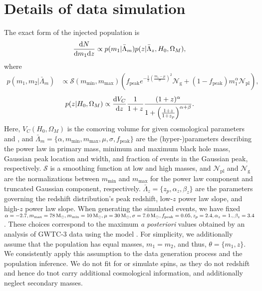 \documentclass[preprint2,linenumbers]{aastex631}
\begin{document}
\section{Details of data simulation}
\label{ap:data generation}
The exact form of the injected population is
\begin{equation}
\label{eq:underlying population}
    \frac{\diff N}{\diff m_1 \diff z} \propto p(m_1|\bar{\Lambda}_m) p(z|\bar{\Lambda}_z, H_0, \Omega_M),
\end{equation}
where 
\begin{align}
    p(m_1,m_2|\bar{\Lambda}_m) &\propto \mathcal{S}(m_{\min},m_{\max})
    \left( f_{\text{peak}}e^{-\frac{1}{2}(\frac{m_1-\mu}{\sigma})^2}\mathcal{N}_{\text{g}} +
    (1-f_{\text{peak}})m_1^{\alpha}\mathcal{N}_{\text{pl}} \right) ,
\label{eq:underlying mass dist}
\end{align}
\begin{equation}
    p(z|H_0, \Omega_M) \propto \frac{\diff V_C}{\diff z} \frac{1}{1+z} \frac{(1+z)^\alpha}{1+\left(\frac{1+z}{1+z_p}\right)^{\alpha+\beta}}.
    \label{eq:underlying redshift dist}
\end{equation}
Here, $V_C(H_0, \Omega_M)$ is the comoving volume for given cosmological parameters \Ho{} and \Omm{}, and $\bar{\Lambda}_m = \{\alpha, m_{\min}, m_{\max}, \mu, \sigma, f_{\text{peak}}\}$ are the (hyper-)parameters describing the power law in primary mass, minimum and maximum black hole mass, Gaussian peak location and width, and fraction of events in the Gaussian peak, respectively.
$\mathcal{S}$ is a smoothing function at low and high masses, and $\mathcal{N}_{\text{pl}}$ and $\mathcal{N}_{\text{g}}$ are the normalizations between  $m_{\min}$ and $m_{\max}$ for the power law component and truncated Gaussian component, respectively.
$\bar{\Lambda}_z = \{z_p,\alpha_z,\beta_z\}$ are the parameters governing the redshift distribution's peak redshift, low-$z$ power law slope, and high-$z$ power law slope.
When generating the simulated events, we have fixed $\alpha=-2.7,m_{\max}=78\,\text{M}_{\odot},m_{\min}=10\,\text{M}_{\odot}, \mu=30\,\text{M}_{\odot},\sigma=7.0\,\text{M}_{\odot}, f_{\text{peak}}=0.05,   z_p=2.4,\alpha_z=1.,\beta_z=3.4$.
These choices correspond to the maximum \emph{a posteriori} values obtained by an analysis of GWTC-3 data using the \plp{} model \citep{abbott_population_2023}.
For simplicity, we additionally assume that the population has equal masses, $m_1=m_2$, and thus, $\theta = \{m_1,z\}$.
We consistently apply this assumption to the data generation process and the population inference.
We do not fit for or simulate spins, as they do not redshift and hence do tnot carry additional cosmological information, and additionally neglect secondary masses.
\end{document}
